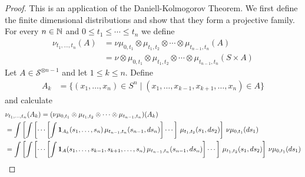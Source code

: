 \begin{proof}
This is an application of the Daniell-Kolmogorov Theorem.  We first
define the finite dimensional distributions and show that they form a
projective family.  For every $n \in \mathbb{N}$ and $0 \leq t_1 \leq
\dotsb \leq t_n$ we define
\begin{align*}
\nu_{t_1, \dotsc, t_n}(A) 
&= \nu \mu_{0,t_1} \otimes \mu_{t_1, t_2} \otimes \dotsb \otimes \mu_{t_{n-1}, t_n}(A) \\
&=\nu \otimes \mu_{0,t_1} \otimes \mu_{t_1, t_2} \otimes \dotsb \otimes \mu_{t_{n-1}, t_n}(S \times A) 
\end{align*}
Let $A \in \mathcal{S}^{\otimes n-1}$ and let $1 \leq k \leq n$.
Define
\begin{align*}
A_k &= \lbrace (x_1, \dotsc, x_n) \in S^n \mid (x_1, \dotsc, x_{k-1},
x_{k+1}, \dotsc, x_n) \in A \rbrace
\end{align*}
and calculate
\begin{align*}
&\nu_{t_1, \dotsc, t_n}(A_k) = ( \nu \mu_{0,t_1} \otimes \mu_{t_1, t_2}
\otimes \dotsb \otimes \mu_{t_{n-1}, t_n})(A_k) \\
&=\int \left [ \int \left[ \dotsb \left [ \int \textbf{1}_{A_k}(s_1,
    \dotsc, s_n) \, \mu_{t_{n-1},t_n}(s_{n-1}, ds_n) \right] \dotsb
\right] \, \mu_{t_1, t_2}(s_1, ds_2) \right ] \, \nu \mu_{0,
t_1}(ds_1) \\
&=\int \left [ \int \left[ \dotsb \left [ \int \textbf{1}_{A}(s_1,
    \dotsc, s_{k-1}, s_{k+1}, \dotsc, s_n) \, \mu_{t_{n-1},t_n}(s_{n-1}, ds_n) \right] \dotsb \right] \, \mu_{t_1, t_2}(s_1, ds_2) \right ] \, \nu \mu_{0, t_1}(ds_1)
\end{align*}


\end{proof}
